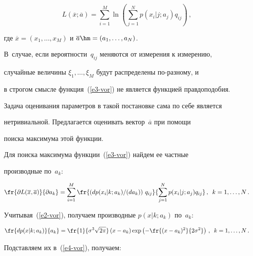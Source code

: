  \begin{equation}

 L(\overline{x};\overline{a}) =\sum\limits_{i=1}^M \ln \left( \sum\limits_{j=1}^N

p(x_i\vert j;a_j)q_{ij} \right)\,,

 \label{e3-vor}

 \end{equation}

где $\overline{x}=(x_1,\ldots , x_M)$ и $\overline{a}\hm= (a_1,\ldots , a_N)$.

В~случае, если вероятности~$q_{ij}$ меняются от измерения к измерению,

случайные величины $\xi_1,\ldots , \xi_M$ будут распределены по-раз\-но\-му, и

в строгом смысле функция~(\ref{e3-vor}) не является функцией правдоподобия.

Задача оценивания параметров в такой постановке сама по себе является

нетривиальной. Предлагается оценивать вектор~$\overline{a}$ при помощи

поиска максимума этой функции.



 Для поиска максимума функции~(\ref{e3-vor}) найдем ее частные

производные по~$a_k$:

 \begin{equation}

 \fr{\partial L(\overline{x},\overline{a})}{\partial a_k} =\sum\limits_{i=1}^M

\fr{\left(dp(x_i\vert k;a_k)/(da_k)\right)\,q_{ij}}

{\sum\limits_{j=1}^N p(x_i\vert j;a_j)q_{ij}}

\,,\enskip k=1,\ldots , N\,.

 \label{e4-vor}

 \end{equation}

Учитывая~(\ref{e2-vor}), получаем производные $p(x\vert k;a_k)$ по~$a_k$:

$$

\fr{dp(x\vert k;a_k)}{a_k} = \fr{1}{\sigma^3\sqrt{2\pi}}\left( x-a_k\right) \exp

\left( -\fr{(x-a_k)^2}{2\sigma^2}\right) \,,\enskip k=1,\ldots , N\,.

$$

Подставляем их в~(\ref{e4-vor}), получаем:

$$

